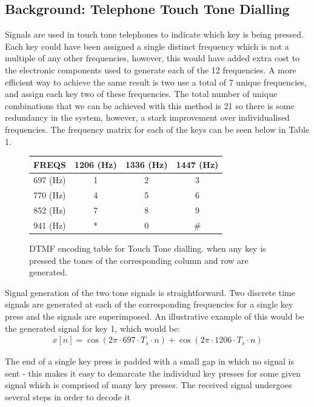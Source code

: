 \documentclass{article}
\begin{document}
\subsection{Background: Telephone Touch Tone Dialling}
Signals are used in touch tone telephones to indicate which key is being pressed. Each key could have been assigned a single distinct frequency which is not a multiple of any other frequencies, however, this would have added extra cost to the electronic components used to generate each of the 12 frequencies. A more efficient way to achieve the same result is two use a total of 7 unique frequencies, and assign each key two of these frequencies. The total number of unique combinations that we can be achieved with this method is 21 so there is some redundancy in the system, however, a stark improvement over individualised frequencies. The frequency matrix for each of the keys can be seen below in Table 1.

\begin{figure}[H]
	\centering
	\begin{tabular}{|c|c|c|c| }
		\hline
		FREQS		&	1206 (Hz)	&	1336 (Hz)	&	1447 (Hz)\\
		\hline
		697 (Hz)	&	1			&	2			&	3\\
		\hline
		770 (Hz)	&	4			&	5			&	6\\
		\hline
		852 (Hz)	&	7			&	8			&	9\\
		\hline
		941 (Hz)	&	*			&	0			&	\#\\
		\hline
	\end{tabular}
	\caption{DTMF encoding table for Touch Tone dialling. when any key is pressed the tones of the corresponding column and row are generated.}
\end{figure}
 
Signal generation of the two tone signals is straightforward. Two discrete time signals are generated at each of the corresponding frequencies for a single key press and the signals are superimposed. An illustrative example of this would be the generated signal for key 1, which would be:
\begin{align*}
	x[n] = \cos(2 \pi \cdot 697 \cdot T_s \cdot n) + \cos(2 \pi \cdot 1206 \cdot T_s \cdot n)
\end{align*}

The end of a single key press is padded with a small gap in which no signal is sent - this makes it easy to demarcate the individual key presses for some given signal which is comprised of many key presses. The received signal undergoes several steps in order to decode it
\end{document}
